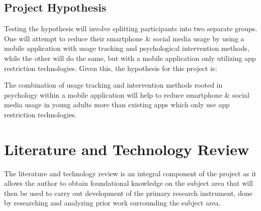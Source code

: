 \documentclass[12pt]{article}
\begin{document}
\subsection{Project Hypothesis}
Testing the hypothesis will involve splitting participants into two 
separate groups. One will attempt to reduce their smartphone \& social media usage by using a mobile 
application with usage tracking and psychological intervention methods, while the other will do the same, but with 
a mobile application only utilizing app restriction technologies. Given this, the hypothesis for 
this project is: \newline

\noindent The combination of usage tracking and intervention methods rooted in psychology within a mobile 
application will help to reduce smartphone \& social media usage in young adults more than existing apps which 
only use app restriction technologies.
\newpage



\section{Literature and Technology Review}

The literature and technology review is an integral component of the project as it allows the author to obtain
foundational knowledge on the subject area that will then be used to carry out development of the primary research
instrument, done by researching and analyzing prior work surrounding the subject area. \newline

\end{document}
